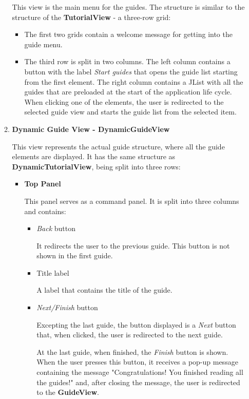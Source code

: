 \documentclass[12pt,a4paper,twoside]{report}
\begin{document}
\begin{enumerate}
\begin{enumerate}
 This view is the main menu for the guides. The structure is similar to the structure of the \textbf{TutorialView} - a three-row grid:
 \begin{itemize}
  \item The first two grids contain a welcome message for getting into the guide menu.
  \item The third row is split in two columns. The left column contains a button with the label \textit{Start guides} that opens the guide list starting from the first element. The right column contains a JList with all the guides that are preloaded at the start of the application life cycle. When clicking one of the elements, the user is redirected to the selected guide view and starts the guide list from the selected item.
 \end{itemize}
 
 
 \item \textbf{Dynamic Guide View - DynamicGuideView}
 
 This view represents the actual guide structure, where all the guide elements are displayed. It has the same structure as \textbf{DynamicTutorialView}, being split into three rows:
 \begin{itemize}
  \item \textbf{Top Panel}
 
 This panel serves as a command panel. It is split into three columns and contains:
 \begin{itemize}
    \item \textit{Back} button 
        
        It redirects the user to the previous guide. This button is not shown in the first guide.
    \item Title label 
        
        A label that contains the title of the guide.
    \item \textit{Next/Finish} button
    
        Excepting the last guide, the button displayed is a \textit{Next} button that, when clicked, the user is redirected to the next guide. 
        
        At the last guide, when finished, the \textit{Finish} button is shown. When the user presses this button, it receives a pop-up message containing the message "Congratulations! You finished reading all the guides!" and, after closing the message, the user is redirected to the \textbf{GuideView}.
        
 \end{itemize}
 

\end{itemize}
\end{enumerate}
\end{enumerate}
\end{document}
